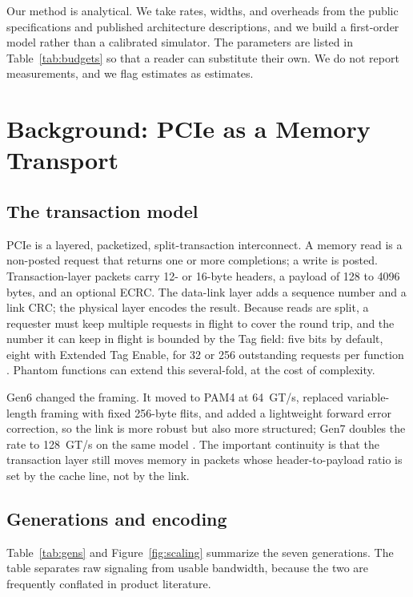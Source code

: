 \documentclass[10pt,letterpaper]{article}
\begin{document}
Our method is analytical. We take rates, widths, and overheads from the public specifications and published architecture descriptions, and we build a first-order model rather than a calibrated simulator. The parameters are listed in Table~\ref{tab:budgets} so that a reader can substitute their own. We do not report measurements, and we flag estimates as estimates.

\section{Background: PCIe as a Memory Transport}

\subsection{The transaction model}

PCIe is a layered, packetized, split-transaction interconnect. A memory read is a non-posted request that returns one or more completions; a write is posted. Transaction-layer packets carry 12- or 16-byte headers, a payload of 128 to 4096 bytes, and an optional ECRC. The data-link layer adds a sequence number and a link CRC; the physical layer encodes the result. Because reads are split, a requester must keep multiple requests in flight to cover the round trip, and the number it can keep in flight is bounded by the Tag field: five bits by default, eight with Extended Tag Enable, for 32 or 256 outstanding requests per function \cite{pcie6}. Phantom functions can extend this several-fold, at the cost of complexity.

Gen6 changed the framing. It moved to PAM4 at 64~GT/s, replaced variable-length framing with fixed 256-byte flits, and added a lightweight forward error correction, so the link is more robust but also more structured; Gen7 doubles the rate to 128~GT/s on the same model \cite{pcie6,pcie7}. The important continuity is that the transaction layer still moves memory in packets whose header-to-payload ratio is set by the cache line, not by the link.

\subsection{Generations and encoding}

Table~\ref{tab:gens} and Figure~\ref{fig:scaling} summarize the seven generations. The table separates raw signaling from usable bandwidth, because the two are frequently conflated in product literature.
\end{document}
